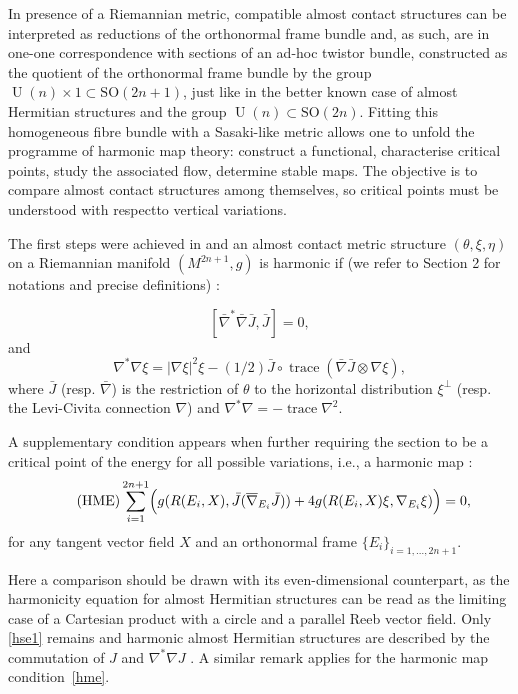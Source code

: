 \documentclass[a4paper,reqno]{amsart}
\theoremstyle{definition}
\theoremstyle{remark}
\theoremstyle{plain}
\numberwithin{equation}{section}
\def\Unit{\operatorname {U}}
\def\Unit{\operatorname {U}}
\DeclareMathOperator{\trace}{{trace}}
\begin{document}
In presence of a Riemannian metric, compatible almost contact
structures can be interpreted as reductions of the orthonormal
frame bundle and, as such, are in one-one correspondence with
sections of an ad-hoc twistor bundle, constructed as the quotient
of the orthonormal frame bundle by the group
$\Unit(n) \times 1 \subset {\mathrm{SO}}(2n+1)$, just like in the
better known case of almost Hermitian structures and the group
$\Unit(n) \subset {\mathrm{SO}}(2n)$. Fitting this homogeneous
fibre bundle with a Sasaki-like metric allows one to unfold the
programme of harmonic map theory: construct a functional,
characterise critical points, study the associated flow,
determine stable maps. The objective is to compare almost contact
structures among themselves, so critical points must be
understood with respectto vertical variations.

The first steps were achieved in \cite{VW1} and an almost contact metric structure $(\theta, \xi,\eta)$ on a Riemannian manifold $(M^{2n+1},g)$ is harmonic if (we refer to Section 2 for notations and precise definitions) \cite[Theorem 3.2]{VW1}:

\begin{equation}\label{hse1}\tag{HSE1}
[\bar{\nabla}^{*}\bar{\nabla} \bar{J} , \bar{J}]=0 ,
\end{equation}
and
\begin{equation}\label{hse2}\tag{HSE2}
\nabla^{*}\nabla \xi = |\nabla\xi|^2 \xi- (1/2) \bar{J}\circ \trace(\bar{\nabla}\bar{J}\otimes\nabla\xi),
\end{equation}
where $\bar{J}$ (resp. $\bar{\nabla}$) is the restriction of $\theta$ to the horizontal distribution $\xi^\perp$ (resp. the Levi-Civita connection $\nabla$)  and $\nabla^{*}\nabla = -\trace \nabla^{2}$.

A supplementary condition appears when further requiring the
section to be a critical point of the energy for all possible
variations, i.e.,  a harmonic map \cite[Theorem 3.4]{VW1}:
\begin{equation}\label{hme}\tag{HME}
\sum_{i=1}^{2n+1}\Bigl(g(R(E_{i}, X) ,  \bar{J} (\overline{\nabla}_{E_i} \bar{J})) +
4g(R(E_{i},X)\xi , \nabla_{E_i}\xi)\Bigr) =0, 
\end{equation}
for any tangent vector field $X$ and an orthonormal frame $\{E_{i}\}_{i=1,\dots,2n+1}$. 


Here a comparison should be drawn with its even-dimensional
counterpart, as the harmonicity equation for almost Hermitian
structures can be read as the limiting case of a Cartesian
product with a circle and a parallel Reeb vector field. Only
\eqref{hse1} remains and harmonic almost Hermitian structures are
described by the commutation of $J$ and $\nabla^{*}\nabla J$
\cite{CMW2}. A similar remark applies for the harmonic map
condition~\eqref{hme}.
\end{document}
